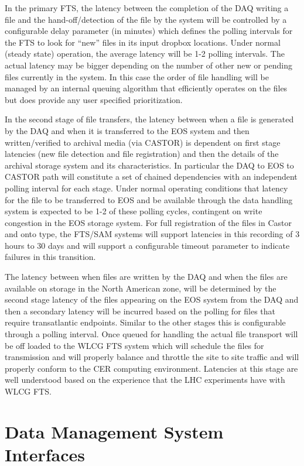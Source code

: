 \documentclass[pdftex,12pt,letter]{article}
\begin{document}
In the primary FTS, the latency between the completion of the DAQ writing a file and the hand-off/detection of the file by the
system will be controlled by a configurable delay parameter (in minutes) which defines the polling intervals for the FTS
to look for ``new'' files in its input dropbox locations.  Under normal (steady state) operation, the average latency will be 1-2 polling intervals.
The actual latency may be bigger depending on the number of other new or pending files currently in the system.
In this case the order of file handling will be managed by an internal queuing algorithm that efficiently operates on the files but
does provide any user specified prioritization.

In the second stage of file transfers, the latency between when a file is generated by the DAQ and when it is transferred to the EOS
system and then written/verified to archival media (via CASTOR) is dependent on first stage latencies (new file detection and file registration)
and then the details of the archival storage system and its characteristics.  In particular the DAQ to EOS to CASTOR path will constitute a set
of chained dependencies with an independent polling interval for each stage.  Under normal operating conditions that latency for the file to
be transferred to EOS and be available through the data handling system is expected to be 1-2 of these polling cycles, contingent on write
congestion in the EOS storage system.   For full registration of the files in Castor and onto type, the FTS/SAM systems will support latencies
in this recording of 3 hours to 30 days and will support a configurable timeout parameter to indicate failures in this transition.

The latency between when files are written by the DAQ and when the files are available on storage in the North American zone,
will be determined by the second stage latency of the files appearing on the EOS system from the DAQ and then a secondary latency
will be incurred based on the polling for files that require transatlantic endpoints.  Similar to the other stages this is configurable
through a polling interval.  Once queued for handling the actual file transport will be off loaded to the WLCG FTS system which will
schedule the files for transmission and will properly balance and throttle the site to site traffic and will properly conform to the CER
 computing environment.  Latencies at this stage are well understood based on the experience that the LHC experiments have with WLCG FTS.  

\section{Data Management System Interfaces}
\end{document}
